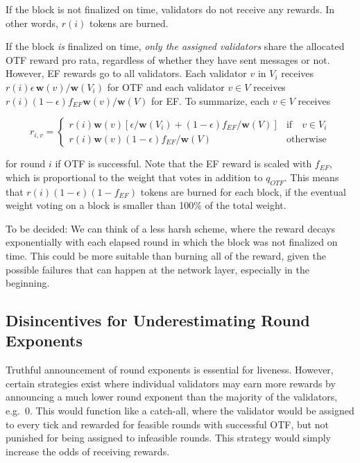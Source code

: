If the block is not finalized on time, validators do not receive any rewards. In other words, $r(i)$ tokens are burned.

If the block \emph{is} finalized on time, \emph{only the assigned validators} share the allocated OTF reward pro rata, regardless of whether they have sent messages or not. However, EF rewards go to all validators. Each validator $v$ in $V_i$ receives $r(i)\epsilon \,\boldsymbol{w}(v)/\boldsymbol{w}(V_i)$ for OTF and each validator $v\in V$ receives $r(i)(1-\epsilon)f_{EF}\boldsymbol{w}(v)/\boldsymbol{w}(V)$ for EF. To summarize, each $v\in V$ receives

\begin{equation}
  r_{i,v} = \begin{cases} r(i)\boldsymbol{w}(v)[\epsilon/\boldsymbol{w}(V_i) + (1-\epsilon)f_{EF}/\boldsymbol{w}(V)] &\text{if}\quad v\in V_i\\
    r(i)\boldsymbol{w}(v)(1-\epsilon)f_{EF}/\boldsymbol{w}(V) & \text{otherwise}
  \end{cases}
\end{equation}

for round $i$ if OTF is successful. Note that the EF reward is scaled with $f_{EF}$, which is proportional to the weight that votes in addition to $q_{OTF}$. This means that $r(i)(1-\epsilon)(1-f_{EF})$ tokens are burned for each block, if the eventual weight voting on a block is smaller than 100\% of the total weight.

To be decided: We can think of a less harsh scheme, where the reward decays exponentially with each elapsed round in which the block was not finalized on time. This could be more suitable than burning all of the reward, given the possible failures that can happen at the network layer, especially in the beginning.

\subsection{Disincentives for Underestimating Round Exponents}
\label{sec:disincentivizing-validators-from-underestimating-round-exponents}

Truthful announcement of round exponents is essential for liveness. However, certain strategies exist where individual validators may earn more rewards by announcing a much lower round exponent than the majority of the validators, e.g.~0. This would function like a catch-all, where the validator would be assigned to every tick and rewarded for feasible rounds with successful OTF, but not punished for being assigned to infeasible rounds. This strategy would simply increase the odds of receiving rewards.

